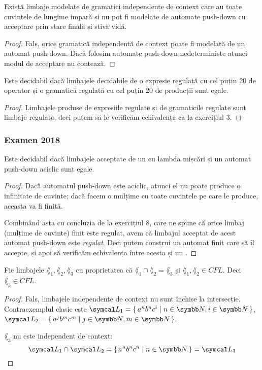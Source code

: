 \begin{exercise}
    Există limbaje modelate de gramatici independente de context care au toate cuvintele de lungime impară și nu pot fi modelate de automate push-down cu acceptare prin stare finală și stivă vidă.
\end{exercise}
\begin{proof}
    Fals, orice gramatică independentă de context poate fi modelată de un automat push-down. Dacă folosim automate push-down nedeterministe atunci modul de acceptare nu contează.
\end{proof}

\begin{exercise}
    Este decidabil dacă limbajele decidabile de o expresie regulată cu cel puțin 20 de operator și o gramatică regulată cu cel puțin 20 de producții sunt egale.
\end{exercise}
\begin{proof}
    Limbajele produse de expresiile regulate și de gramaticile regulate sunt limbaje regulate, deci putem să le verificăm echivalența ca la exercițiul 3.
\end{proof}

\subsubsection*{Examen 2018}

\begin{exercise}
    Este decidabil dacă limbajele acceptate de un \nfa{} cu lambda mișcări și un automat push-down aciclic sunt egale.
\end{exercise}
\begin{proof}
    Dacă automatul push-down este aciclic, atunci el nu poate produce o infinitate de cuvinte; dacă facem o mulțime cu toate cuvintele pe care le produce, aceasta va fi finită.

    Combinând asta cu concluzia de la exercițiul 8, care ne spune că orice limbaj (mulțime de cuvinte) finit este regulat, avem că limbajul acceptat de acest automat push-down este \emph{regulat}. Deci putem construi un automat finit care să îl accepte, și apoi să verificăm echivalența între acesta și un \nfa{}.
\end{proof}

\begin{exercise}
    Fie limbajele \(\lang_1, \lang_2, \lang_3\) cu proprietatea că \(\lang_1 \cap \lang_2 = \lang_3\) și \(\lang_1, \lang_2 \in CFL\). Deci \(\lang_3 \in CFL\).
\end{exercise}
\begin{proof}
    Fals, limbajele independente de context nu sunt închise la intersecție. Contraexemplul clasic este \(\lang_1 = \set{ a^n b^n c^i | n \in \naturals, i \in \naturals }\), \(\lang_2 = \set{ a^j b^m c^m | j \in \naturals, m \in \naturals }\).

    \(\lang_3\) nu este independent de context:
    \[\lang_1 \cap \lang_2 = \set{ a^n b^n c^n | n \in \naturals } = \lang_3\]
\end{proof}

